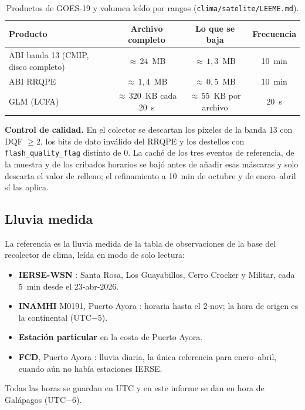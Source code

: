 \documentclass{sosg-informe}
\begin{document}
\begin{table}[ht]
  \centering\small
  \caption{Productos de GOES-19 y volumen leído por rangos (\texttt{clima/satelite/LEEME.md}).}
  \label{tab:productos}
  \begin{tabular}{lccc}
    \toprule
    Producto & Archivo completo & Lo que se baja & Frecuencia \\
    \midrule
    ABI banda 13 (CMIP, disco completo) & ${\approx}\,24$~MB & ${\approx}\,1,3$~MB & 10~min \\
    ABI RRQPE & ${\approx}\,1,4$~MB & ${\approx}\,0,5$~MB & 10~min \\
    GLM (LCFA) & ${\approx}\,320$~KB cada 20~s & ${\approx}\,55$~KB por archivo & 20~s \\
    \bottomrule
  \end{tabular}
\end{table}

\textbf{Control de calidad.} En el colector se descartan los píxeles de la banda 13 con DQF $\geq 2$, los bits de dato inválido del RRQPE y los destellos con \texttt{flash\_quality\_flag} distinto de 0. La caché de los tres eventos de referencia, de la muestra y de los cribados horarios se bajó antes de añadir esas máscaras y solo descarta el valor de relleno; el refinamiento a 10~min de octubre y de enero--abril sí las aplica.

\subsection{Lluvia medida}
La referencia es la lluvia medida de la tabla de observaciones de la base del recolector de clima, leída en modo de solo lectura:
\begin{itemize}
  \item \textbf{IERSE-WSN} \citep{ierse2023}: Santa Rosa, Los Guayabillos, Cerro Crocker y Militar, cada 5~min desde el 23-abr-2026.
  \item \textbf{INAMHI} M0191, Puerto Ayora \citep{inamhi2026}: horaria hasta el 2-nov; la hora de origen es la continental (UTC$-5$).
  \item \textbf{Estación particular} en la costa de Puerto Ayora.
  \item \textbf{FCD}, Puerto Ayora \citep{fcd2026}: lluvia diaria, la única referencia para enero--abril, cuando aún no había estaciones IERSE.
\end{itemize}
Todas las horas se guardan en UTC y en este informe se dan en hora de Galápagos (UTC$-6$).
\end{document}
